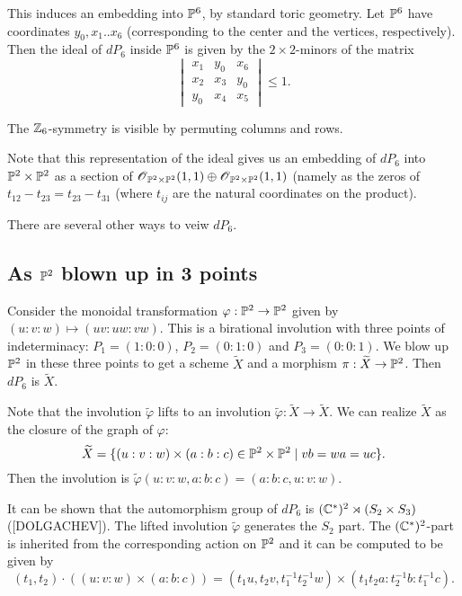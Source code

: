 \documentclass[11pt, english]{article}
\begin{document}
This induces an embedding into $\mathbb{P}^6$, by standard toric geometry. Let $\mathbb{P}^6$ have coordinates $y_0,x_1..x_6$ (corresponding to the center and the vertices, respectively). Then the ideal of $dP_6$ inside $\mathbb{P}^6$ is given by the $2 \times 2$-minors of the matrix
\begin{equation}
\label{eqdp6}
\begin{vmatrix}
x_1 & y_0 & x_6 \\
x_2 & x_3 & y_0 \\
y_0 & x_4 & x_5
\end{vmatrix} \leq 1.
\end{equation}

The $\mathbb{Z}_6$-symmetry is visible by permuting columns and rows. 

Note that this representation of the ideal gives us an embedding of $dP_6$ into $\mathbb{P}^2 \times \mathbb{P}^2$ as a section of $\operatorname{\mathscr{O}}_{\mathbb{P}^2 \times \mathbb{P}^2}(1,1)\oplus\operatorname{\mathscr{O}}_{\mathbb{P}^2 \times \mathbb{P}^2}(1,1)$ (namely as the zeros of $t_{12}-t_{23}=t_{23}-t_{31}$ (where $t_{ij}$ are the natural coordinates on the product).

There are several other ways to veiw $dP_6$.

\subsection{As $\mathbb{P}^2$ blown up in 3 points}

Consider the monoidal transformation $\varphi:\mathbb{P}^2 \to \mathbb{P}^2$ given by $(u:v:w) \mapsto (uv:uw:vw)$. This is a birational involution with three points of indeterminacy: $P_1=(1:0:0)$, $P_2=(0:1:0)$ and $P_3=(0:0:1)$. We blow up $\mathbb{P}^2$ in these three points to get a scheme $\widetilde X$ and a morphism $\pi:\widetilde X \to \mathbb{P}^2$. Then $dP_6$ is $\widetilde X$.

\begin{remark}
Note that the involution $\widetilde \varphi $ lifts to an involution  $\widetilde \varphi: \widetilde X \to \widetilde X$. We can realize $\widetilde X$ as the closure of the graph of $\varphi$:
$$
\widetilde X = \{ (u:v:w) \times  (a:b:c) \in \mathbb{P}^2 \times \mathbb{P}^2 \mid vb=wa=uc \}.
$$
Then the involution is $\widetilde \varphi(u:v:w,a:b:c) = (a:b:c, u:v:w)$.
\end{remark}

It can be shown that the automorphism group of $dP_6$ is $(\mathbb{C}^\ast)^2 \rtimes (S_2 \times S_3)$ ([DOLGACHEV]). The lifted involution $\widetilde \varphi$ generates the $S_2$ part. The $(\mathbb{C}^\ast)^2$-part is inherited from the corresponding action on $\mathbb{P}^2$ and it can be computed to be given by
$$
(t_1,t_2) \cdot ((u:v:w)\times (a:b:c)) = (t_1u,t_2v, t_1^{-1}t_2^{-1}w) \times (t_1t_2a: t_2^{-1}b: t_1^{-1} c).
$$
\end{document}
